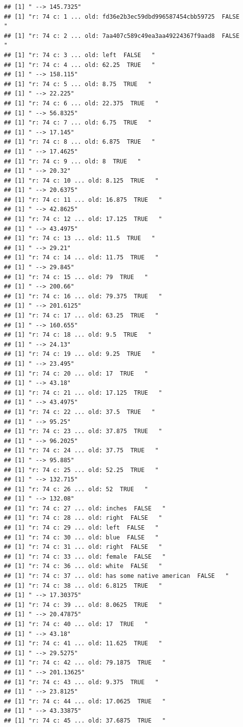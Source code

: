 \documentclass[]{article}
\begin{document}
\begin{verbatim}
## [1] " --> 145.7325"
## [1] "r: 74 c: 1 ... old: fd36e2b3ec59dbd996587454cbb59725  FALSE   "
## [1] "r: 74 c: 2 ... old: 7aa407c589c49ea3aa49224367f9aad8  FALSE   "
## [1] "r: 74 c: 3 ... old: left  FALSE   "
## [1] "r: 74 c: 4 ... old: 62.25  TRUE   "
## [1] " --> 158.115"
## [1] "r: 74 c: 5 ... old: 8.75  TRUE   "
## [1] " --> 22.225"
## [1] "r: 74 c: 6 ... old: 22.375  TRUE   "
## [1] " --> 56.8325"
## [1] "r: 74 c: 7 ... old: 6.75  TRUE   "
## [1] " --> 17.145"
## [1] "r: 74 c: 8 ... old: 6.875  TRUE   "
## [1] " --> 17.4625"
## [1] "r: 74 c: 9 ... old: 8  TRUE   "
## [1] " --> 20.32"
## [1] "r: 74 c: 10 ... old: 8.125  TRUE   "
## [1] " --> 20.6375"
## [1] "r: 74 c: 11 ... old: 16.875  TRUE   "
## [1] " --> 42.8625"
## [1] "r: 74 c: 12 ... old: 17.125  TRUE   "
## [1] " --> 43.4975"
## [1] "r: 74 c: 13 ... old: 11.5  TRUE   "
## [1] " --> 29.21"
## [1] "r: 74 c: 14 ... old: 11.75  TRUE   "
## [1] " --> 29.845"
## [1] "r: 74 c: 15 ... old: 79  TRUE   "
## [1] " --> 200.66"
## [1] "r: 74 c: 16 ... old: 79.375  TRUE   "
## [1] " --> 201.6125"
## [1] "r: 74 c: 17 ... old: 63.25  TRUE   "
## [1] " --> 160.655"
## [1] "r: 74 c: 18 ... old: 9.5  TRUE   "
## [1] " --> 24.13"
## [1] "r: 74 c: 19 ... old: 9.25  TRUE   "
## [1] " --> 23.495"
## [1] "r: 74 c: 20 ... old: 17  TRUE   "
## [1] " --> 43.18"
## [1] "r: 74 c: 21 ... old: 17.125  TRUE   "
## [1] " --> 43.4975"
## [1] "r: 74 c: 22 ... old: 37.5  TRUE   "
## [1] " --> 95.25"
## [1] "r: 74 c: 23 ... old: 37.875  TRUE   "
## [1] " --> 96.2025"
## [1] "r: 74 c: 24 ... old: 37.75  TRUE   "
## [1] " --> 95.885"
## [1] "r: 74 c: 25 ... old: 52.25  TRUE   "
## [1] " --> 132.715"
## [1] "r: 74 c: 26 ... old: 52  TRUE   "
## [1] " --> 132.08"
## [1] "r: 74 c: 27 ... old: inches  FALSE   "
## [1] "r: 74 c: 28 ... old: right  FALSE   "
## [1] "r: 74 c: 29 ... old: left  FALSE   "
## [1] "r: 74 c: 30 ... old: blue  FALSE   "
## [1] "r: 74 c: 31 ... old: right  FALSE   "
## [1] "r: 74 c: 33 ... old: female  FALSE   "
## [1] "r: 74 c: 36 ... old: white  FALSE   "
## [1] "r: 74 c: 37 ... old: has some native american  FALSE   "
## [1] "r: 74 c: 38 ... old: 6.8125  TRUE   "
## [1] " --> 17.30375"
## [1] "r: 74 c: 39 ... old: 8.0625  TRUE   "
## [1] " --> 20.47875"
## [1] "r: 74 c: 40 ... old: 17  TRUE   "
## [1] " --> 43.18"
## [1] "r: 74 c: 41 ... old: 11.625  TRUE   "
## [1] " --> 29.5275"
## [1] "r: 74 c: 42 ... old: 79.1875  TRUE   "
## [1] " --> 201.13625"
## [1] "r: 74 c: 43 ... old: 9.375  TRUE   "
## [1] " --> 23.8125"
## [1] "r: 74 c: 44 ... old: 17.0625  TRUE   "
## [1] " --> 43.33875"
## [1] "r: 74 c: 45 ... old: 37.6875  TRUE   "

\end{verbatim}
\end{document}
